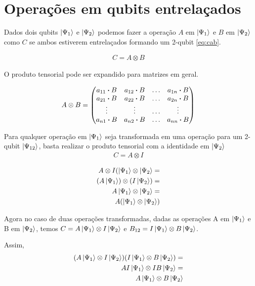 \documentclass[a4paper, 12pt, oneside]{book}
\begin{document}
\section{Operações em qubits entrelaçados}

Dados dois qubits $\ket{\Psi_1}$ e $\ket{\Psi_2}$ podemos fazer a operação $A$ em $\ket{\Psi_1}$ e $B$ em $\ket{\Psi_2}$ como $C$ se ambos estiverem entrelaçados formando um 2-qubit \eqref{eq:cab}.

\begin{align} \label{eq:cab}
C = A \otimes B
\end{align}

O produto tensorial pode ser expandido para matrizes em geral.

\begin{align*}
A \otimes B = \mqty(a_{11}\vdot B & a_{12}\vdot B & \hdots & a_{1n}\vdot B \\
  a_{21}\vdot B & a_{22}\vdot B & \hdots & a_{2n}\vdot B \\
  \vdots & \vdots & \hdots & \vdots \\
  a_{n1}\vdot B & a_{n2}\vdot B & \hdots & a_{nn}\vdot B \\
)
\end{align*}

Para qualquer operação em $\ket{\Psi_1}$ seja transformada em uma operação para um 2-qubit $\ket{\Psi_{12}}$, basta realizar o produto tensorial com a identidade em $\ket{\Psi_2}$ 
\begin{align} \label{eq:cai}
C = A \otimes I
\end{align}

\begin{align*}
A \otimes I (\ket{\Psi_1} \otimes \ket{\Psi_2} = \\
  (A\ket{\Psi_1}) \otimes (I\ket{\Psi_2}) = \\
  A\ket{\Psi_1} \otimes \ket{\Psi_2} = \\
  A(\ket{\Psi_1} \otimes \ket{\Psi_2})
\end{align*}

Agora no caso de duas operações transformadas, dadas as operações A em $\ket{\Psi_1}$ e B em $\ket{\Psi_2}$, temos $C = A\ket{\Psi_1} \otimes I\ket{\Psi_2}$ e $B_{12} = I\ket{\Psi_1} \otimes B\ket{\Psi_2}$.

Assim,
\begin{align*}
(A\ket{\Psi_1} \otimes I\ket{\Psi_2})(I\ket{\Psi_1} \otimes B\ket{\Psi_2}) = \\
AI\ket{\Psi_1} \otimes IB\ket{\Psi_2} = \\
A\ket{\Psi_1} \otimes B\ket{\Psi_2}
\end{align*}
\end{document}
